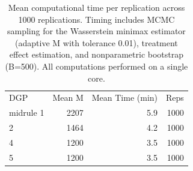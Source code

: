 \begin{table}[ht]
\centering
\caption{Mean computational time per replication across 1000 replications.
Timing includes MCMC sampling for the Wasserstein minimax estimator
(adaptive M with tolerance 0.01), treatment effect estimation, and
nonparametric bootstrap (B=500). All computations performed on a single core.}
\label{tab:timing}
\begin{tabular}{lrrr}
\toprule
DGP & Mean M & Mean Time (min) & Reps \\midrule
1 & 2207 & 5.9 & 1000 \\
2 & 1464 & 4.2 & 1000 \\
4 & 1200 & 3.5 & 1000 \\
5 & 1200 & 3.5 & 1000 \\
\bottomrule
\end{tabular}
\end{table}
